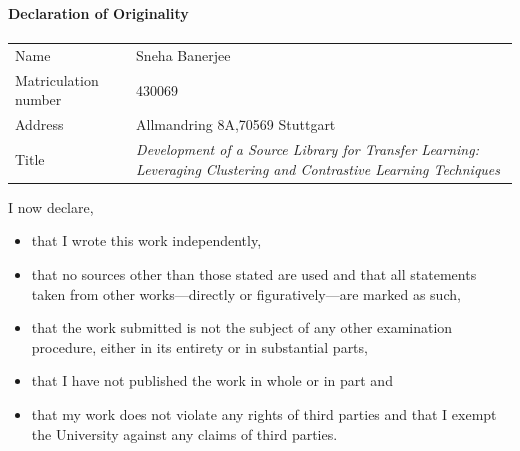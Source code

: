 
\begin{titlepage}

\Large\textbf{Declaration of Originality}
\paragraph{}
\hskip-0.8cm
    \begin{tabular}{p{1.8in}p{4.8in}}
        Name & Sneha Banerjee \\
        Matriculation number & 430069 \\
        Address & Allmandring 8A,70569 Stuttgart \\        
        Title & \textit{Development of a Source Library for Transfer Learning: Leveraging Clustering and Contrastive Learning Techniques} \\
    \end{tabular}

\vspace{1cm}
I now declare,
\begin{itemize}
    \item that I wrote this work independently,
    \item that no sources other than those stated are used and that all statements taken from
other works—directly or figuratively—are marked as such,
    \item that the work submitted is not the subject of any other examination procedure,
either in its entirety or in substantial parts,
    \item that I have not published the work in whole or in part and
    \item that my work does not violate any rights of third parties and that I exempt the
University against any claims of third parties.
    \end{itemize} 
\end{titlepage}